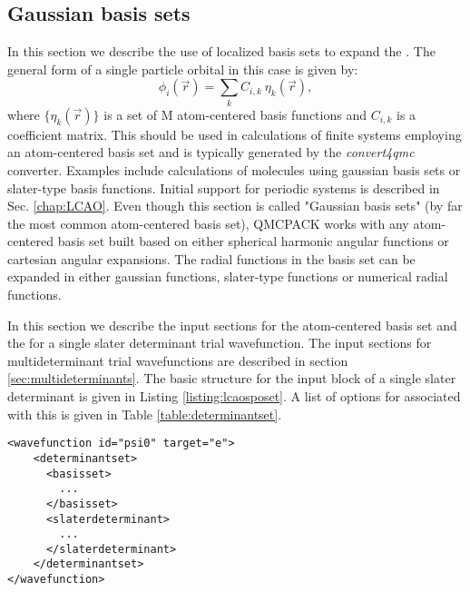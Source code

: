 \subsection{Gaussian basis sets}
\label{sec:gaussianbasis}

In this section we describe the use of localized basis sets to expand the . The general form of a single particle orbital in this case is given by:
\begin{equation}
\phi_i(\vec{r}) = \sum_k C_{i,k} \ \eta_k(\vec{r}),
\end{equation}
where $\{\eta_k(\vec{r})\}$ is a set of M atom-centered basis
functions and $C_{i,k}$ is a coefficient matrix. This 
should be used in calculations of finite systems employing an
atom-centered basis set and is typically generated by the
\textit{convert4qmc} converter.  Examples include calculations of
molecules using gaussian basis sets or slater-type basis
functions. Initial support for periodic systems is described in Sec.
\ref{chap:LCAO}. Even though this section is called "Gaussian basis
sets" (by far the most common atom-centered basis set), QMCPACK works
with any atom-centered basis set built based on either spherical
harmonic angular functions or cartesian angular expansions. The radial
functions in the basis set can be expanded in either gaussian
functions, slater-type functions or numerical radial functions.

In this section we describe the input sections for the atom-centered basis set and the  for a single slater determinant trial wavefunction. The input sections for multideterminant trial wavefunctions are described in section \ref{sec:multideterminants}. The basic structure for the input block of a single slater determinant is given in Listing \ref{listing:lcaosposet}.
A list of options for  associated with this  is given in Table \ref{table:determinantset}.

\begin{minipage}{\linewidth}
\begin{lstlisting}[style=QMCPXML,caption=Basic input block for a single determinant trial wavefunction using a sposet expanded on an atom-centered basis set. \label{listing:lcaosposet}]
<wavefunction id="psi0" target="e">
    <determinantset>
      <basisset>
        ...
      </basisset>
      <slaterdeterminant>
        ...
      </slaterdeterminant>
    </determinantset>    
</wavefunction>
\end{lstlisting}
\end{minipage}

